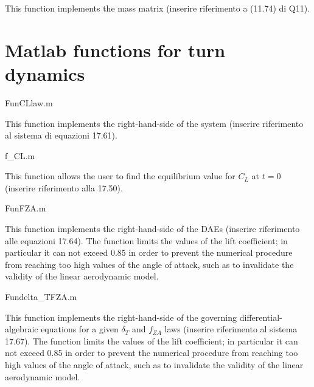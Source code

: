 \documentclass[[12pt,twoside]{book}
\begin{document}
    This function implements the mass matrix (inserire riferimento a (11.74) di Q11).


\chapter%
   [Matlab functions for turn dynamics]%
   {Matlab functions for turn dynamics}
\label{chap:Appendix:Matlab:Turn}

    
    {FunCLlaw.m} 
    
    This function implements the right-hand-side of the system (inserire riferimento al sistema di equazioni 17.61).
    
    
    {f_CL.m} 
    
    This function allows the user to find the equilibrium value for $C_L$ at $t=0$ (inserire riferimento alla 17.50).


    {FunFZA.m} 
    
    This function implements the right-hand-side of the DAEs (inserire riferimento alle equazioni 17.64). The function limits the values of the lift coefficient; in particular it can not exceed 0.85 in order to prevent the numerical procedure from reaching too high values of the angle of attack, such as to invalidate the validity of the linear aerodynamic model.
    
    
    {Fundelta_TFZA.m} 
    
    This function implements the right-hand-side of the governing differential-algebraic equations for a given $\delta_T$ and $f_{ZA}$ laws (inserire riferimento al sistema 17.67). The function limits the values of the lift coefficient; in particular it can not exceed 0.85 in order to prevent the numerical procedure from reaching too high values of the angle of attack, such as to invalidate the validity of the linear aerodynamic model. 
    
\end{document}
